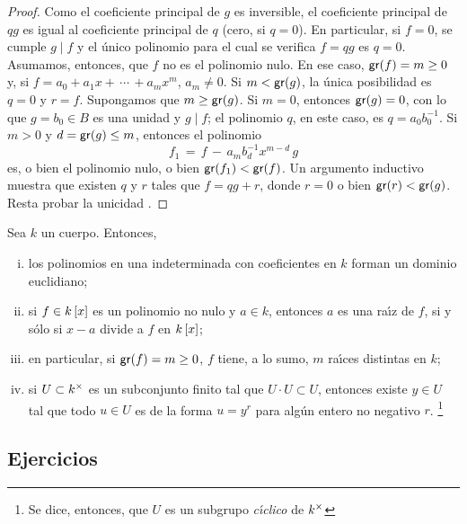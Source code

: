 \begin{proof}
	Como el coeficiente principal de $g$ es inversible, el coeficiente
	principal de $qg$ es igual al coeficiente principal de $q$
	(cero, si $q=0$). En particular, si $f=0$, se cumple
	$g\mid f$ y el \'unico polinomio para el cual se verifica $f=qg$
	es $q=0$. Asumamos, entonces, que $f$ no es el polinomio nulo. En
	ese caso, $\mathsf{gr}(f)=m\geq 0$ y, si $f=a_0+a_1x+\,\cdots\,+a_mx^m$,
	$a_m\neq 0$. Si $m<\mathsf{gr}(g)$, la \'unica posibilidad es
	$q=0$ y $r=f$. Supongamos que $m\geq \mathsf{gr}(g)$. Si $m=0$, entonces
	$\mathsf{gr}(g)=0$, con lo que $g=b_0\in B$ es una unidad y $g\mid f$;
	el polinomio $q$, en este caso, es $q=a_0b_0^{-1}$. Si $m>0$ y
	$d=\mathsf{gr}(g)\leq m$, entonces el polinomio
	\begin{displaymath}
		f_1\,=\,f\,-\,a_mb_d^{-1}x^{m-d}\,g
	\end{displaymath}
	es, o bien el polinomio nulo, o bien $\mathsf{gr}(f_1)<\mathsf{gr}(f)$.
	Un argumento inductivo muestra que existen $q$ y $r$ tales que
	$f=qg+r$, donde $r=0$ o bien $\mathsf{gr}(r)<\mathsf{gr}(g)$.
	Resta probar la unicidad \quedacomoejercicio.
\end{proof}

\begin{coroPolinomios}\label{coro:polinomios:algoritmo}
	Sea $k$ un cuerpo. Entonces,
	\begin{enumerate}[(i)]
		\item\label{item:coro:polinomios:algoritmo:euclidiano}
			los polinomios en una indeterminada con
			coeficientes en $k$ forman un dominio euclidiano;
		\item\label{item:coro:polinomios:algoritmo:raices}
			si $f\in{k}\left[x\right]$ es un polinomio no nulo
			y $a\in k$, entonces $a$ es una ra\'{\i}z de $f$,
			si y s\'olo si $x-a$ divide a $f$ en ${k}\left[x\right]$;
		\item\label{item:coro:polinomios:algoritmo:raices:bis}
			en particular, si $\mathsf{gr}(f)=m\geq 0$, $f$ tiene,
			a lo sumo, $m$ ra\'{\i}ces distintas en $k$;
		\item\label{item:coro:polinomios:algoritmo:finito}
			si $U\subset{k}^\times$ es un subconjunto finito
			tal que $U\cdot U\subset U$, entonces existe
			$y\in U$ tal que todo $u\in U$ es de la forma
			$u=y^r$ para alg\'un entero no negativo $r$.%
			\footnote{
				Se dice, entonces, que $U$ es un subgrupo
				\emph{c\'{\i}clico} de ${k}^\times$
			}
	\end{enumerate}
\end{coroPolinomios}

\subsection*{Ejercicios}


